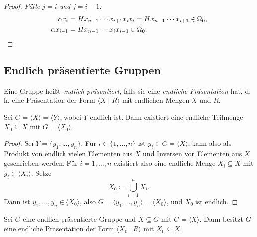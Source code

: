 \documentclass[11pt]{article}
\begin{document}
\begin{proof}
  \textit{Fälle $j = i$ und $j = i - 1$:}
  \begin{align*}
    \alpha x_i &= H x_{n-1} \dotsm x_{i+1} x_i x_i = H x_{n-1} \dotsm x_{i+1} \in \Omega_0, \\
    \alpha x_{i-1} &= H x_{n-1} \dotsm x_i x_{i-1} \in \Omega_0. \qedhere
  \end{align*}
\end{proof}

\subsection{Endlich präsentierte Gruppen}

\begin{definition}\Theorem
  Eine Gruppe heißt \emph{endlich präsentiert}, falls sie eine \emph{endliche Präsentation} hat, d.\,h. eine Präsentation der Form $\langle X \mid R \rangle$ mit endlichen Mengen $X$ und $R$.
\end{definition}

\begin{lemma}\Theorem
  Sei $G = \langle X \rangle = \langle Y \rangle$, wobei $Y$ endlich ist. Dann existiert eine endliche Teilmenge $X_0 \subseteq X$ mit $G = \langle X_0 \rangle$.
\end{lemma}

\begin{proof}
  Sei $Y = \{y_1, \dots, y_n\}$. Für $i \in \{1, \dots, n\}$ ist $y_i \in G = \langle X \rangle$, kann also als Produkt von endlich vielen Elementen aus $X$ und Inversen von Elementen aus $X$ geschrieben werden. Für $i = 1, \dots, n$ existiert also eine endliche Menge $X_i \subseteq X$ mit $y_i \in \langle X_i \rangle$. Setze
  \[ X_0 \coloneqq \bigcup_{i=1}^{n} X_i. \]
  Dann ist $y_1, \dots, y_n \in \langle X_0 \rangle$, also $G = \langle y_1, \dots, y_n \rangle = \langle X_0 \rangle$, und $X_0$ ist endlich.
\end{proof}


\begin{theorem}\Theorem
  Sei $G$ eine endlich präsentierte Gruppe und $X \subseteq G$ mit $G = \langle X \rangle$. Dann besitzt $G$ eine endliche Präsentation der Form $\langle X_0 \mid R \rangle$ mit $X_0 \subseteq X$.
\end{theorem}
\end{document}
